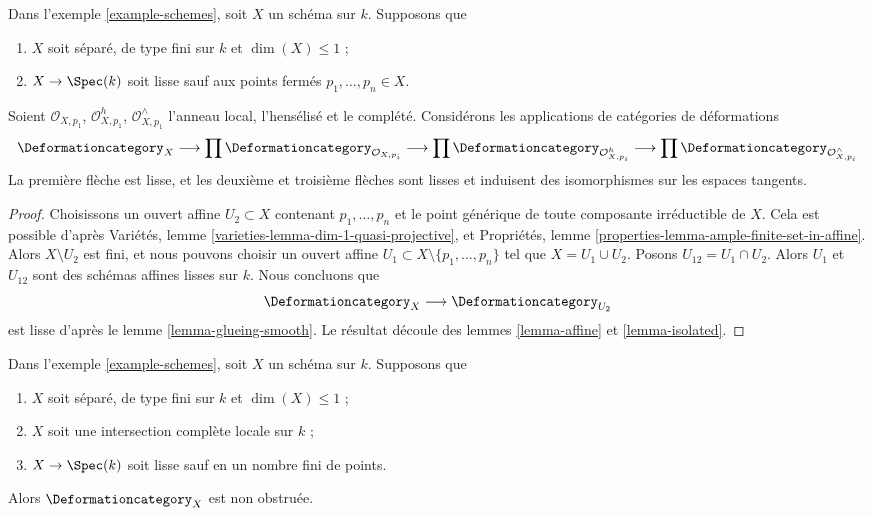 \begin{lemma}
\label{lemma-curve-isolated}
Dans l'exemple \ref{example-schemes}, soit $X$ un schéma sur $k$. Supposons que
\begin{enumerate}
\item $X$ soit séparé, de type fini sur $k$ et $\dim(X) \leq 1$ ;
\item $X \to \Spec(k)$ soit lisse sauf aux
points fermés $p_1, \ldots, p_n \in X$.
\end{enumerate}
Soient $\mathcal{O}_{X, p_1}$, $\mathcal{O}_{X, p_1}^h$,
$\mathcal{O}_{X, p_1}^\wedge$ l'anneau local, l'hensélisé et le complété.
Considérons les applications de catégories de déformations
$$
\Deformationcategory_X
\longrightarrow
\prod \Deformationcategory_{\mathcal{O}_{X, p_i}}
\longrightarrow
\prod \Deformationcategory_{\mathcal{O}_{X, p_i}^h}
\longrightarrow
\prod \Deformationcategory_{\mathcal{O}_{X, p_i}^\wedge}
$$
La première flèche est lisse, et les deuxième et troisième flèches
sont lisses et induisent des isomorphismes sur les espaces tangents.
\end{lemma}

\begin{proof}
Choisissons un ouvert affine $U_2 \subset X$ contenant
$p_1, \ldots, p_n$ et le point générique de toute composante
irréductible de $X$. Cela est possible d'après
Variétés, lemme \ref{varieties-lemma-dim-1-quasi-projective},
et Propriétés, lemme \ref{properties-lemma-ample-finite-set-in-affine}.
Alors $X \setminus U_2$ est fini, et nous pouvons choisir un ouvert affine
$U_1 \subset X \setminus \{p_1, \ldots, p_n\}$ tel que
$X = U_1 \cup U_2$. Posons $U_{12} = U_1 \cap U_2$.
Alors $U_1$ et $U_{12}$ sont des schémas affines lisses sur $k$.
Nous concluons que
$$
\Deformationcategory_X \longrightarrow \Deformationcategory_{U_2}
$$
est lisse d'après le lemme \ref{lemma-glueing-smooth}.
Le résultat découle des lemmes \ref{lemma-affine} et \ref{lemma-isolated}.
\end{proof}

\begin{lemma}
\label{lemma-curve-isolated-lci}
Dans l'exemple \ref{example-schemes}, soit $X$ un schéma sur $k$. Supposons que
\begin{enumerate}
\item $X$ soit séparé, de type fini sur $k$ et $\dim(X) \leq 1$ ;
\item $X$ soit une intersection complète locale sur $k$ ;
\item $X \to \Spec(k)$ soit lisse sauf en un nombre fini de points.
\end{enumerate}
Alors $\Deformationcategory_X$ est non obstruée.
\end{lemma}

